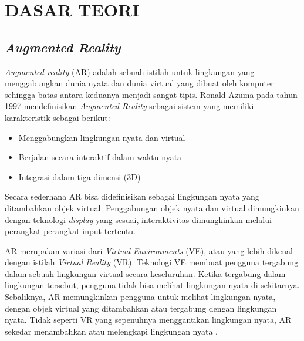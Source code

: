 \chapter{DASAR TEORI}
\label{chap:dasar_teori}

\section{\textit{Augmented Reality}}
\label{sec:AR}
\textit{Augmented reality} (AR) adalah sebuah istilah untuk lingkungan yang menggabungkan dunia nyata dan dunia virtual yang dibuat oleh komputer sehingga batas antara keduanya menjadi sangat tipis. Ronald Azuma pada tahun 1997 \cite{Azuma1997} mendefinisikan \textit{Augmented Reality} sebagai sistem yang memiliki karakteristik sebagai berikut:
\begin{itemize}
	\item Menggabungkan lingkungan nyata dan virtual
	\item Berjalan secara interaktif dalam waktu nyata
	\item Integrasi dalam tiga dimensi (3D)
\end{itemize}
Secara sederhana AR bisa didefinisikan sebagai lingkungan nyata yang ditambahkan objek virtual. Penggabungan objek nyata dan virtual dimungkinkan dengan teknologi \textit{display} yang sesuai, interaktivitas dimungkinkan melalui perangkat-perangkat input tertentu.  

AR merupakan variasi dari \textit{Virtual Environments} (VE), atau yang lebih dikenal dengan istilah \textit{Virtual Reality} (VR). Teknologi VE membuat pengguna tergabung dalam sebuah lingkungan virtual secara keseluruhan. Ketika tergabung dalam lingkungan tersebut, pengguna tidak bisa melihat lingkungan nyata di sekitarnya. Sebaliknya, AR memungkinkan pengguna untuk melihat lingkungan nyata, dengan objek virtual yang ditambahkan atau tergabung dengan lingkungan nyata. Tidak seperti VR yang sepenuhnya menggantikan lingkungan nyata, AR sekedar menambahkan atau melengkapi lingkungan nyata \cite{Azuma1997}. 

